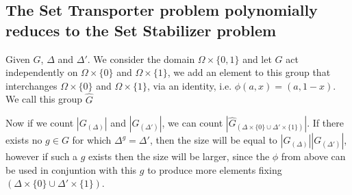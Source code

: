 \subsection{The Set Transporter problem polynomially reduces to the Set Stabilizer problem}

Given $G$, $\Delta$ and $\Delta'$. We consider the domain $\Omega \times \{0,1\}$ and let $G$ act independently on $\Omega \times \{0\}$ and $\Omega \times \{1\}$, we add an element to this group that interchanges $\Omega \times \{0\}$ and $\Omega \times \{1\}$, via an identity, i.e. $\phi(a,x)=(a,1-x)$. We call this group $\hat{G}$

Now if we count $|G_{(\Delta)}|$ and $|G_{(\Delta')}|$, we can count $|\hat{G}_{(\Delta\times \{0\} \cup \Delta'\times \{1\})}|$. If there exists no $g \in G$ for which $\Delta^g=\Delta'$, then the size will be equal to $|G_{(\Delta)}||G_{(\Delta')}|$, however if such a $g$ exists then the size will be larger, since the $\phi$ from above can be used in conjuntion with this $g$ to produce more elements fixing $(\Delta\times \{0\} \cup \Delta'\times \{1\})$.

